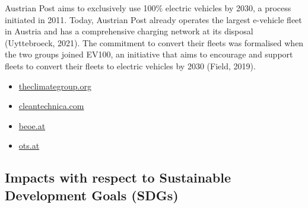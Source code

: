 \documentclass[
]{book}
\providecommand{\tightlist}{%
  \setlength{\itemsep}{0pt}\setlength{\parskip}{0pt}}
\begin{document}
Austrian Post aims to exclusively use 100\% electric vehicles by 2030, a process initiated in 2011. Today, Austrian Post already operates the largest e-vehicle fleet in Austria and has a comprehensive charging network at its disposal (Uyttebroeck, 2021). The commitment to convert their fleets was formalised when the two groups joined EV100, an initiative that aims to encourage and support fleets to convert their fleets to electric vehicles by 2030 (Field, 2019).

\begin{itemize}
\tightlist
\item
  \href{https://www.theclimategroup.org/ev100}{theclimategroup.org}
\item
  \href{https://cleantechnica.com/2019/04/27/the-swiss-austrian-post-announce-commitment-to-100-evs-by-2030/}{cleantechnica.com}
\item
  \href{https://www.beoe.at/about-us/}{beoe.at}
\item
  \href{https://www.ots.at/pressemappe/17440/bundesverband-elektromobilitaet-oesterreich-beoe}{ots.at}
\end{itemize}

\hypertarget{impacts-with-respect-to-sustainable-development-goals-sdgs-27}{%
\subsection*{Impacts with respect to Sustainable Development Goals (SDGs)}\label{impacts-with-respect-to-sustainable-development-goals-sdgs-27}}
\end{document}
